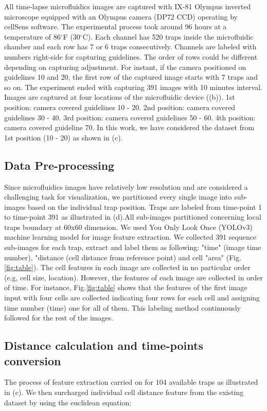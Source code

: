 \documentclass[conference]{IEEEtran}
\begin{document}
All time-lapse microfluidics images are captured with IX-81 Olympus inverted microscope equipped with an Olympus camera (DP72 CCD) operating by cellSens software. The experimental process took around 96 hours at a temperature of 86$^{\circ}$F (30$^{\circ}$C). Each channel has 520 traps inside the microfluidic chamber and each row has 7 or 6 traps consecutively. Channels are labeled with numbers right-side for capturing guidelines. The order of rows could be different depending on capturing adjustment. For instant, if the camera positioned on guidelines 10 and 20, the first row of the captured image starts with 7 traps and so on. The experiment ended with capturing 391 images with 10 minutes interval. Images are captured at four locations of the microfluidic device ((b)). 1st position: camera covered guidelines 10 - 20. 2nd position: camera covered guidelines 30 - 40. 3rd position: camera covered guidelines 50 - 60. 4th position: camera covered guideline 70. In this work, we have considered the dataset from 1st position (10 - 20) as shown in (c).



\subsection{Data Pre-processing}
Since microfluidics images have relatively low resolution and are considered a challenging task for visualization, we partitioned every single image into sub-images based on the individual trap position. Traps are labeled from time-point 1 to time-point 391 as illustrated in (d).All sub-images partitioned concerning local traps boundary at 60x60 dimension. We used You Only Look Once (YOLOv3) \cite{ref20} machine learning model for image feature extraction. We collected 391 sequence sub-images for each trap, extract and label them as following: "time" (image time number), "distance (cell distance from reference point) and cell "area" (Fig.\ref{fig:table}). The cell features in each image are collected in no particular order (e.g, cell size, location). However, the features of each image are collected in order of time. For instance, Fig.\ref{fig:table} shows that the features of the first image input with four cells are collected indicating four rows for each cell and assigning time number (time) one for all of them. This labeling method continuously followed for the rest of the images.

\subsection{Distance calculation and time-points conversion}
The process of feature extraction carried on for 104 available traps as illustrated in (c). We then surcharged individual cell distance feature from the existing dataset by using the euclidean equation:
\end{document}
